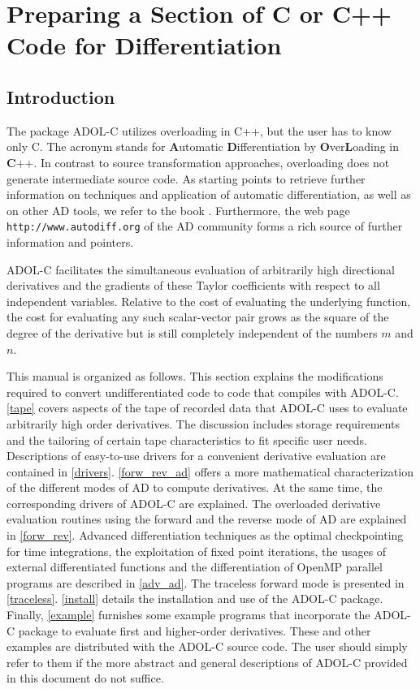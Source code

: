 \documentclass[11pt,twoside]{article}
\begin{document}
\newpage
%
%
\section{Preparing a Section of C or C++ Code for Differentiation}
\label{prepar}
%
\subsection{Introduction}
%
\setcounter{equation}{0}
The package \mbox{ADOL-C} 
utilizes overloading in C++, but the
user has to know only C. The acronym stands for {\bf A}utomatic 
{\bf D}ifferentiation by {\bf O}ver{\bf L}oading in {\bf C}++.
In contrast to source transformation approaches, overloading does not generate intermediate
source code. 
As starting points to retrieve further information on techniques and
application of automatic differentiation, as well as on other AD
tools, we refer to the book \cite{GrWa08}. Furthermore, the web page
\verb=http://www.autodiff.org= of the AD community forms a rich source
of further information and pointers.


ADOL-C facilitates the simultaneous
evaluation of arbitrarily high directional derivatives and the
gradients of these Taylor coefficients with respect to all independent
variables. Relative to the cost of evaluating the underlying function, 
the cost for evaluating any such scalar-vector pair grows as the
square of the degree of the derivative but is still completely
independent of the numbers $m$ and $n$. 

This manual is organized as follows. This section explains the 
modifications required to convert undifferentiated code to code that 
compiles with ADOL-C. 
\autoref{tape} covers aspects of the tape of recorded data that ADOL-C uses to
evaluate arbitrarily high order derivatives. The discussion includes storage 
requirements and the tailoring of certain tape characteristics to fit specific
user needs. Descriptions of easy-to-use drivers for a  convenient derivative 
evaluation are contained in \autoref{drivers}. 
\autoref{forw_rev_ad} offers a more mathematical characterization of
the different modes of AD to compute derivatives. At the same time, the
corresponding drivers of ADOL-C are explained.  
The overloaded derivative evaluation routines using the forward and the reverse
mode of AD are explained in \autoref{forw_rev}. 
Advanced differentiation techniques as the optimal checkpointing for
time integrations, the exploitation of fixed point iterations, the usages
of external differentiated functions and the differentiation of OpenMP
parallel programs are described in \autoref{adv_ad}. 
The traceless forward mode is presented in \autoref{traceless}.
\autoref{install} details the installation and 
use of the ADOL-C package. Finally, \autoref{example} 
furnishes some example programs that incorporate the ADOL-C package to 
evaluate first and higher-order
derivatives.  These and other examples are distributed with the ADOL-C
source code.
The user should simply refer to them if the more abstract and general 
descriptions of ADOL-C provided in this document do not suffice.
%
\end{document}
